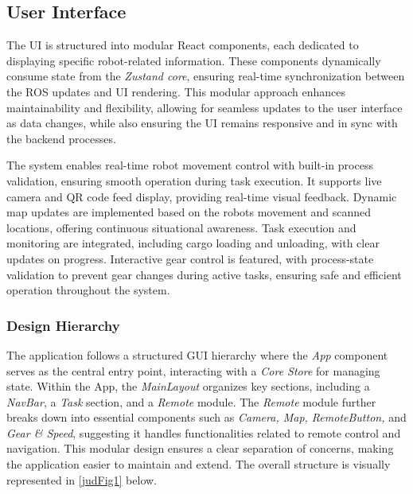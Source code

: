 \documentclass[../../main]{subfiles}
\begin{document}
\subsection{User Interface}
The UI is structured into modular React components, each dedicated to
displaying specific robot-related information. These components
dynamically consume state from the \emph{Zustand core}, ensuring
real-time synchronization between the ROS updates and UI rendering. This
modular approach enhances maintainability and flexibility, allowing for
seamless updates to the user interface as data changes, while also
ensuring the UI remains responsive and in sync with the backend
processes.

The system enables real-time robot movement control with built-in
process validation, ensuring smooth operation during task execution. It
supports live camera and QR code feed display, providing real-time
visual feedback. Dynamic map updates are implemented based on the
robot\textquotesingle s movement and scanned locations, offering
continuous situational awareness. Task execution and monitoring are
integrated, including cargo loading and unloading, with clear updates on
progress. Interactive gear control is featured, with process-state
validation to prevent gear changes during active tasks, ensuring safe
and efficient operation throughout the system.

\subsubsection{Design Hierarchy}

The application follows a structured GUI hierarchy where the \emph{App}
component serves as the central entry point, interacting with a
\emph{Core Store} for managing state. Within the App, the
\emph{MainLayout} organizes key sections, including a \emph{NavBar}, a
\emph{Task} section, and a \emph{Remote} module. The \emph{Remote}
module further breaks down into essential components such as
\emph{Camera, Map, RemoteButton,} and \emph{Gear \& Speed}, suggesting
it handles functionalities related to remote control and navigation.
This modular design ensures a clear separation of concerns, making the
application easier to maintain and extend. The overall structure is
visually represented in \cref{judFig1} below.
\end{document}
